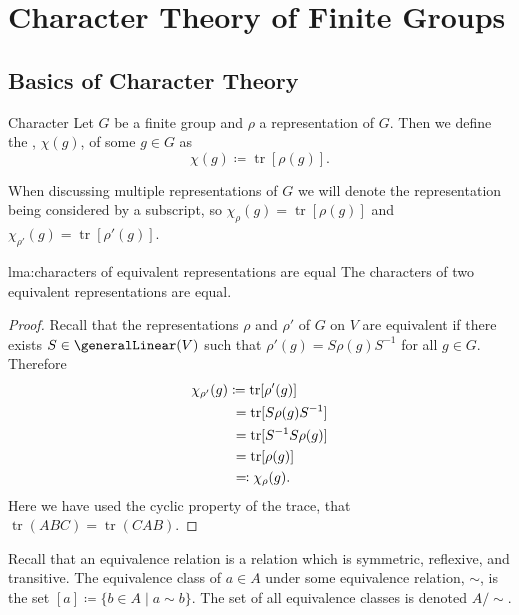 \documentclass[fleqn]{NotesClass}
\DeclareMathOperator{\tr}{tr}
\begin{document}
    \chapter{Character Theory of Finite Groups}
    \section{Basics of Character Theory}
    \begin{dfn}{Character}{}
        Let \(G\) be a finite group and \(\rho\) a representation of \(G\).
        Then we define the , \(\chi(g)\), of some \(g \in G\) as
        \begin{equation}
            \chi(g) \coloneqq \tr[\rho(g)].
        \end{equation}
    \end{dfn}
    \begin{ntn}{}{}
        When discussing multiple representations of \(G\) we will denote the representation being considered by a subscript, so \(\chi_\rho(g) = \tr[\rho(g)]\) and \(\chi_{\rho'}(g) = \tr[\rho'(g)]\).
    \end{ntn}
    
    \begin{lma}{}{lma:characters of equivalent representations are equal}
        The characters of two equivalent representations are equal.
        \begin{proof}
            Recall that the representations \(\rho\) and \(\rho'\) of \(G\) on \(V\) are equivalent if there exists \(S \in \generalLinear(V)\) such that \(\rho'(g) = S\rho(g) S^{-1}\) for all \(g \in G\).
            Therefore
            \begin{align}
                \chi_{\rho'}(g) &\coloneqq \tr[\rho'(g)]\\
                &\hphantom{:}= \tr[S\rho(g)S^{-1}]\\
                &\hphantom{:}= \tr[S^{-1}S\rho(g)]\\
                &\hphantom{:}= \tr[\rho(g)]\\
                &\hphantom{:}\eqqcolon \chi_{\rho}(g).
            \end{align}
            Here we have used the cyclic property of the trace, that \(\tr(ABC) = \tr(CAB)\).
        \end{proof}
    \end{lma}
    
    Recall that an equivalence relation is a relation which is symmetric, reflexive, and transitive.
    The equivalence class of \(a \in A\) under some equivalence relation, \(\sim\), is the set \([a] \coloneqq \{b \in A \mid a \sim b\}\).
    The set of all equivalence classes is denoted \(A/\sim\).
    
\end{document}
